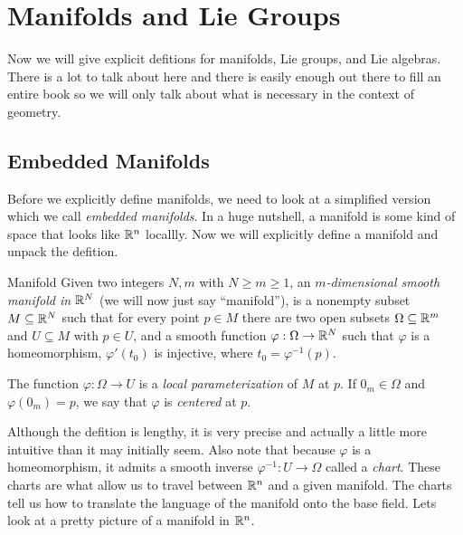 \section{Manifolds and Lie Groups}

Now we will give explicit defitions for manifolds, Lie groups, and Lie algebras.
There is a lot to talk about here and there is easily enough out there to fill an 
entire book so we will only talk about what is necessary in the context of geometry.

\subsection{Embedded Manifolds}
Before we explicitly define manifolds, we need to look at a simplified version which
we call \textit{embedded manifolds}. In a huge nutshell, a manifold is some kind
of space that looks like $\mathbb{R}^n$ locallly. Now we will explicitly define a manifold
and unpack the defition.

\begin{boxdef}{Manifold}{}
    Given two integers $N,m$ with $N \geq m \geq 1$, an $m$\textit{-dimensional smooth
    manifold in $\mathbb{R}^N$} (we will now just say ``manifold''), is a nonempty subset
    $M \subseteq \mathbb{R}^N$ such that for every point $p \in M$ there are two open subsets
    $\Omega \subseteq \mathbb{R}^m$ and $U \subseteq M$ with $p\in U$, and a smooth function
    $\varphi: \Omega \to \mathbb{R}^N$ such that $\varphi$ is a homeomorphism, $\varphi ' (t_0)$
    is injective, where $t_0 = \varphi^{-1}(p)$.
    \vspace{5mm}
    
    The function $\varphi: \Omega \to U$ is a \textit{local parameterization} of $M$
    at $p$. If $0_m \in \Omega$ and $\varphi(0_m) = p$, we say that $\varphi$ is
    \textit{centered} at $p$.
\end{boxdef}

Although the defition is lengthy, it is very precise and actually a little more intuitive
than it may initially seem. Also note that because $\varphi$ is a homeomorphism,
it admits a smooth inverse $\varphi^{-1}:U \to \Omega$ called a \textit{chart}. These
charts are what allow us to travel between $\mathbb{R}^n$ and a given manifold. The charts
tell us how to translate the language of the manifold onto the base field. Lets 
look at a pretty picture of a manifold in $\mathbb{R}^n$.


